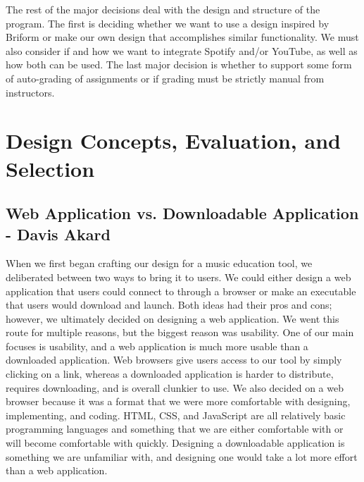 \documentclass[12pt, letterpaper]{article}
\begin{document}
The rest of the major decisions deal with the design and structure of the program. The first is deciding whether we want to use a design inspired by Briform or make our own design that accomplishes similar functionality. We must also consider if and how we want to integrate Spotify and/or YouTube, as well as how both can be used. The last major decision is whether to support some form of auto-grading of assignments or if grading must be strictly manual from instructors.

\section*{Design Concepts, Evaluation, and Selection}
\subsection*{Web Application vs. Downloadable Application - Davis Akard}
When we first began crafting our design for a music education tool, we deliberated between two ways to bring it to users. We could either design a web application that users could connect to through a browser or make an executable that users would download and launch. Both ideas had their pros and cons; however, we ultimately decided on designing a web application. We went this route for multiple reasons, but the biggest reason was usability. One of our main focuses is usability, and a web application is much more usable than a downloaded application. Web browsers give users access to our tool by simply clicking on a link, whereas a downloaded application is harder to distribute, requires downloading, and is overall clunkier to use. We also decided on a web browser because it was a format that we were more comfortable with designing, implementing, and coding. HTML, CSS, and JavaScript are all relatively basic programming languages and something that we are either comfortable with or will become comfortable with quickly. Designing a downloadable application is something we are unfamiliar with, and designing one would take a lot more effort than a web application.
\end{document}
